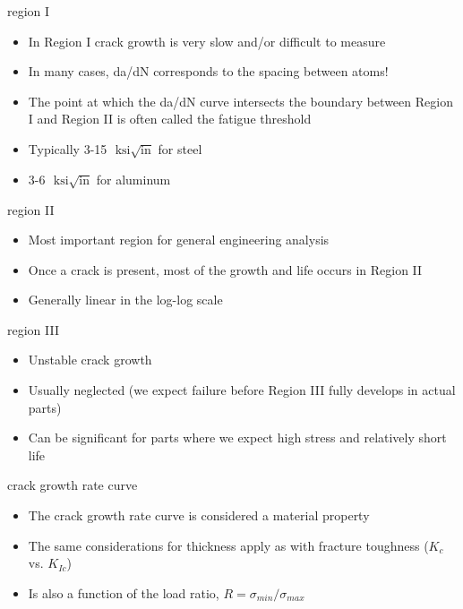 \documentclass[10pt]{beamer}
\begin{document}
\begin{frame}{region I}
	\begin{itemize}[<+->]
		\item In Region I crack growth is very slow and/or difficult to measure
		\item In many cases, da/dN corresponds to the spacing between atoms!
		\item The point at which the da/dN curve intersects the boundary between Region I and Region II is often called the fatigue threshold
		\item Typically 3-15 $\text{ ksi} \sqrt{\text{in}}$ for steel
		\item 3-6 $\text{ ksi} \sqrt{\text{in}}$ for aluminum
	\end{itemize}
\end{frame}

\begin{frame}{region II}
	\begin{itemize}[<+->]
		\item Most important region for general engineering analysis
		\item Once a crack is present, most of the growth and life occurs in Region II
		\item Generally linear in the log-log scale
	\end{itemize}
\end{frame}

\begin{frame}{region III}
	\begin{itemize}[<+->]
		\item Unstable crack growth
		\item Usually neglected (we expect failure before Region III fully develops in actual parts)
		\item Can be significant for parts where we expect high stress and relatively short life
	\end{itemize}
\end{frame}

\begin{frame}{crack growth rate curve}
	\begin{itemize}[<+->]
		\item The crack growth rate curve is considered a material property
		\item The same considerations for thickness apply as with fracture toughness ($K_c$ vs. $K_{Ic}$) 
		\item Is also a function of the load ratio, $R = \sigma_{min}/\sigma_{max}$
	\end{itemize}
\end{frame}
\end{document}
